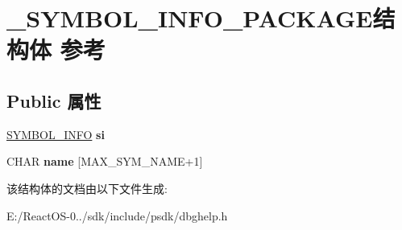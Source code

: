 \hypertarget{struct___s_y_m_b_o_l___i_n_f_o___p_a_c_k_a_g_e}{}\section{\+\_\+\+S\+Y\+M\+B\+O\+L\+\_\+\+I\+N\+F\+O\+\_\+\+P\+A\+C\+K\+A\+G\+E结构体 参考}
\label{struct___s_y_m_b_o_l___i_n_f_o___p_a_c_k_a_g_e}
\subsection*{Public 属性}
\begin{DoxyCompactItemize}
\item 
\mbox{\label{struct___s_y_m_b_o_l___i_n_f_o___p_a_c_k_a_g_e_aba450bc8f477d113cfc29219c860d9db}} 
\hyperlink{struct___s_y_m_b_o_l___i_n_f_o}{S\+Y\+M\+B\+O\+L\+\_\+\+I\+N\+FO} {\bfseries si}
\item 
\mbox{\label{struct___s_y_m_b_o_l___i_n_f_o___p_a_c_k_a_g_e_a7c4798009a4fbd373dc0e057b4615d71}} 
C\+H\+AR {\bfseries name} \mbox{[}M\+A\+X\+\_\+\+S\+Y\+M\+\_\+\+N\+A\+ME+1\mbox{]}
\end{DoxyCompactItemize}


该结构体的文档由以下文件生成\+:\begin{DoxyCompactItemize}
\item 
E\+:/\+React\+O\+S-\/0../sdk/include/psdk/dbghelp.\+h\end{DoxyCompactItemize}
